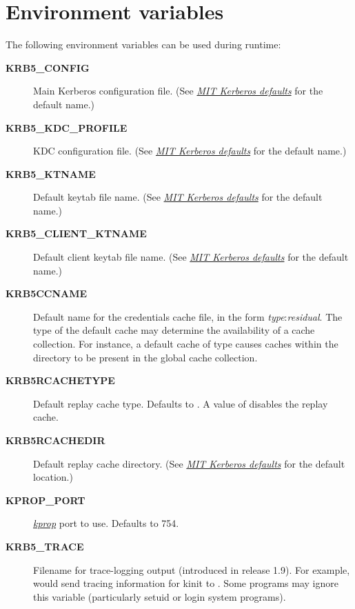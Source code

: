 \documentclass[letterpaper,10pt,english]{sphinxmanual}
\begin{document}
\chapter{Environment variables}
\label{admin/env_variables:environment-variables}\label{admin/env_variables::doc}
The following environment variables can be used during runtime:
\begin{description}
\item[{\textbf{KRB5\_CONFIG}}] \leavevmode
Main Kerberos configuration file.  (See {\hyperref[mitK5defaults:mitk5defaults]{\emph{MIT Kerberos defaults}}} for
the default name.)

\item[{\textbf{KRB5\_KDC\_PROFILE}}] \leavevmode
KDC configuration file.  (See {\hyperref[mitK5defaults:mitk5defaults]{\emph{MIT Kerberos defaults}}} for the default
name.)

\item[{\textbf{KRB5\_KTNAME}}] \leavevmode
Default keytab file name.  (See {\hyperref[mitK5defaults:mitk5defaults]{\emph{MIT Kerberos defaults}}} for the
default name.)

\item[{\textbf{KRB5\_CLIENT\_KTNAME}}] \leavevmode
Default client keytab file name.  (See {\hyperref[mitK5defaults:mitk5defaults]{\emph{MIT Kerberos defaults}}} for
the default name.)

\item[{\textbf{KRB5CCNAME}}] \leavevmode
Default name for the credentials cache file, in the form \emph{type}:\emph{residual}.  The type of the default cache may determine the
availability of a cache collection.  For instance, a default cache
of type  causes caches within the directory to be present
in the global cache collection.

\item[{\textbf{KRB5RCACHETYPE}}] \leavevmode
Default replay cache type.  Defaults to .  A value of
 disables the replay cache.

\item[{\textbf{KRB5RCACHEDIR}}] \leavevmode
Default replay cache directory.  (See {\hyperref[mitK5defaults:mitk5defaults]{\emph{MIT Kerberos defaults}}} for the
default location.)

\item[{\textbf{KPROP\_PORT}}] \leavevmode
{\hyperref[admin/admin_commands/kprop:kprop-8]{\emph{kprop}}} port to use.  Defaults to 754.

\item[{\textbf{KRB5\_TRACE}}] \leavevmode
Filename for trace-logging output (introduced in release 1.9).
For example,  would send
tracing information for kinit to .  Some programs
may ignore this variable (particularly setuid or login system
programs).

\end{description}
\end{document}
